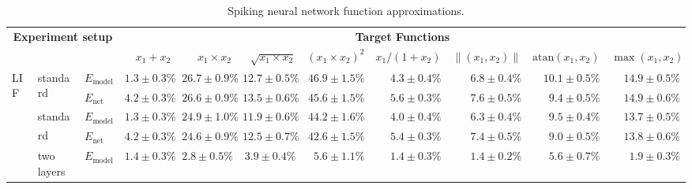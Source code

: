 

\begin{sidewaystable}
	\caption{Spiking neural network function approximations.}
	\label{tbl:function_approximations_complete}
	\centering
	\sffamily
	\scriptsize
	\begin{tabular}{p{2.2cm} p{1.7cm} l r r r r r r r r }
	\toprule
	\multicolumn{3}{c}{\textbf{Experiment setup}} & \multicolumn{8}{c}{{\textbf{Target Functions}}}\\
	\cmidrule(r){1-3}\cmidrule{4-11}
	& & & $x_1 + x_2$ & $x_1 \times x_2$ & $\sqrt{x_1 \times x_2}$ & $(x_1 \times x_2) ^ 2$ & $x_1 / (1 + x_2)$ & $\|(x_1, x_2)\|$ & $\mathrm{atan}(x_1, x_2)$ & $\max(x_1, x_2)$\\
	\midrule
	\multirow{8}{2.2cm}{\raggedleft %
	LIF} &
	\multirow{2}{1.7cm}{\raggedleft standard} &
	$E_\mathrm{model}$ & 
	\color{Gray}$1.3 \pm 0.3\%$ & \color{Gray}$26.7 \pm 0.9\%$ & \color{Gray}$12.7 \pm 0.5\%$ & \color{Gray}$46.9 \pm 1.5\%$ & \color{Gray}$4.3 \pm 0.4\%$ & \color{Gray}$6.8 \pm 0.4\%$ & \color{Gray}$10.1 \pm 0.5\%$ & \color{Gray}$14.9 \pm 0.5\%$
	\\
	& & 
	$E_\mathrm{net}$ &
	\cellcolor{White!75!SteelBlue}$4.2 \pm 0.3\%$ & \cellcolor{White!7!SteelBlue}$26.6 \pm 0.9\%$ & \cellcolor{White!7!SteelBlue}$13.5 \pm 0.6\%$ & \cellcolor{White!7!SteelBlue}$45.6 \pm 1.5\%$ & \cellcolor{White!69!SteelBlue}$5.6 \pm 0.3\%$ & \cellcolor{White!44!SteelBlue}$7.6 \pm 0.5\%$ & \cellcolor{White!44!SteelBlue}$9.4 \pm 0.5\%$ & \cellcolor{White!19!SteelBlue}$14.9 \pm 0.6\%$
	\\\cmidrule(l){2-11}
	&
	\multirow{2}{1.7cm}{\raggedleft standard\textsuperscript{\dag}} &
	$E_\mathrm{model}$ & 
	\color{Gray}$1.3 \pm 0.3\%$ & \color{Gray}$24.9 \pm 1.0\%$ & \color{Gray}$11.9 \pm 0.6\%$ & \color{Gray}$44.2 \pm 1.6\%$ & \color{Gray}$4.0 \pm 0.4\%$ & \color{Gray}$6.3 \pm 0.4\%$ & \color{Gray}$9.5 \pm 0.4\%$ & \color{Gray}$13.7 \pm 0.5\%$
	\\
	& & 
	$E_\mathrm{net}$ &
	\cellcolor{White!69!SteelBlue}$4.2 \pm 0.3\%$ & \cellcolor{White!13!SteelBlue}$24.6 \pm 0.9\%$ & \cellcolor{White!13!SteelBlue}$12.5 \pm 0.7\%$ & \cellcolor{White!13!SteelBlue}$42.6 \pm 1.5\%$ & \cellcolor{White!75!SteelBlue}$5.4 \pm 0.3\%$ & \cellcolor{White!50!SteelBlue}$7.4 \pm 0.5\%$ & \cellcolor{White!63!SteelBlue}$9.0 \pm 0.5\%$ & \cellcolor{White!25!SteelBlue}$13.8 \pm 0.6\%$
	\\\cmidrule(l){2-11}
	&
	\multirow{2}{1.7cm}{\raggedleft two layers} &
	$E_\mathrm{model}$ & 
	\color{Gray}$1.4 \pm 0.3\%$ & \color{Gray}$2.8 \pm 0.5\%$ & \color{Gray}$3.9 \pm 0.4\%$ & \color{Gray}$5.6 \pm 1.1\%$ & \color{Gray}$1.4 \pm 0.3\%$ & \color{Gray}$1.4 \pm 0.2\%$ & \color{Gray}$5.6 \pm 0.7\%$ & \color{Gray}$1.9 \pm 0.3\%$

\end{tabular}
\end{sidewaystable}
